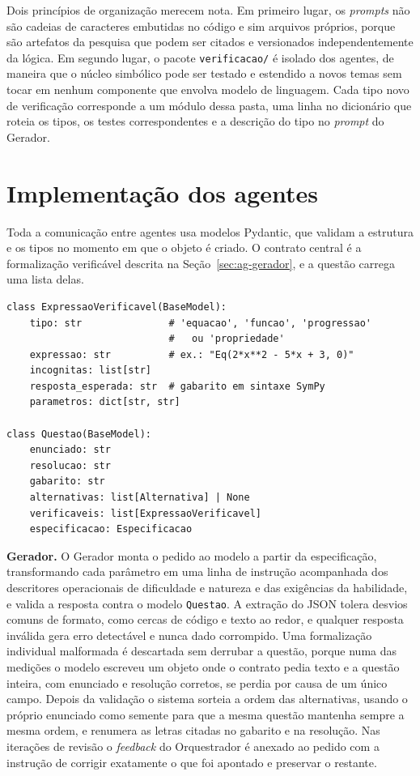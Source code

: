 Dois princípios de organização merecem nota. Em primeiro lugar, os \emph{prompts} não são cadeias
de caracteres embutidas no código e sim arquivos próprios, porque são artefatos da pesquisa que
podem ser citados e versionados independentemente da lógica. Em segundo lugar, o pacote
\texttt{verificacao/} é isolado dos agentes, de maneira que o núcleo simbólico pode ser testado e
estendido a novos temas sem tocar em nenhum componente que envolva modelo de linguagem. Cada tipo
novo de verificação corresponde a um módulo dessa pasta, uma linha no dicionário que roteia os
tipos, os testes correspondentes e a descrição do tipo no \emph{prompt} do Gerador.

\section{Implementação dos agentes}
\label{sec:impl-agentes}

Toda a comunicação entre agentes usa modelos Pydantic, que validam a estrutura e os tipos no
momento em que o objeto é criado. O contrato central é a formalização verificável descrita na
Seção~\ref{sec:ag-gerador}, e a questão carrega uma lista delas.

\begin{verbatim}
class ExpressaoVerificavel(BaseModel):
    tipo: str               # 'equacao', 'funcao', 'progressao'
                            #   ou 'propriedade'
    expressao: str          # ex.: "Eq(2*x**2 - 5*x + 3, 0)"
    incognitas: list[str]
    resposta_esperada: str  # gabarito em sintaxe SymPy
    parametros: dict[str, str]

class Questao(BaseModel):
    enunciado: str
    resolucao: str
    gabarito: str
    alternativas: list[Alternativa] | None
    verificaveis: list[ExpressaoVerificavel]
    especificacao: Especificacao
\end{verbatim}

\textbf{Gerador.} O Gerador monta o pedido ao modelo a partir da especificação, transformando cada
parâmetro em uma linha de instrução acompanhada dos descritores operacionais de dificuldade e
natureza e das exigências da habilidade, e valida a resposta contra o modelo \texttt{Questao}. A
extração do JSON tolera desvios comuns de formato, como cercas de código e texto ao redor, e
qualquer resposta inválida gera erro detectável e nunca dado corrompido. Uma formalização
individual malformada é descartada sem derrubar a questão, porque numa das medições o modelo
escreveu um objeto onde o contrato pedia texto e a questão inteira, com enunciado e resolução
corretos, se perdia por causa de um único campo. Depois da validação o sistema sorteia a ordem das
alternativas, usando o próprio enunciado como semente para que a mesma questão mantenha sempre a
mesma ordem, e renumera as letras citadas no gabarito e na resolução. Nas iterações de revisão o
\emph{feedback} do Orquestrador é anexado ao pedido com a instrução de corrigir exatamente o que foi
apontado e preservar o restante.

